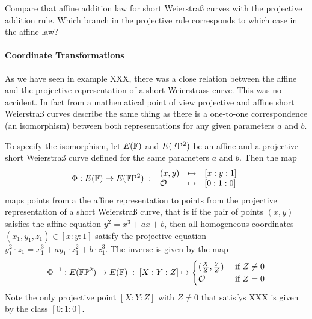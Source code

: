 


\begin{exercise}
Compare that affine addition law for short Weierstraß curves with the projective addition rule. Which branch in the projective rule corresponds to which case in the affine law?
\end{exercise}

\paragraph{Coordinate Transformations} As we have seen in example XXX, there was a close relation between the affine and the projective representation of a short Weierstrass curve. This was no accident.
In fact from a mathematical point of view projective and affine short Weierstraß curves describe the same thing as there is a one-to-one correspondence (an isomorphism) between both representations for any given parameters $a$ and $b$.

To specify the isomorphism, let $E(\mathbb{F})$ and $E(\mathbb{F}\mathrm{P}^2)$ be an affine and a projective short Weierstraß curve defined for the same parameters $a$ and $b$. Then the map
\begin{equation}
\Phi : E(\mathbb{F}) \to E(\mathbb{F}\mathrm{P}^2)\;:\;
\begin{array}{lcl}
(x,y)       &\mapsto & [x:y:1]\\
\mathcal{O} &\mapsto & [0:1:0]
\end{array}
\end{equation}
maps points from a the affine representation to points from the projective representation of a short Weierstraß curve, that is if the pair of points $(x,y)$ saisfies the affine equation $y^2= x^3 + ax + b$, then all homogeneous coordinates $(x_1,y_1,z_1)\in [x:y:1]$ satisfy the projective equation $y_1^2\cdot z_1= x_1^3 + ay_1\cdot z_1^2 + b\cdot z_1^3$. The inverse is given by the map
\begin{equation}
\Phi^{-1} : E(\mathbb{F}\mathbb{P}^2)\to E(\mathbb{F}) \;:\; [X:Y:Z] \mapsto \begin{cases}
(\frac{X}{Z},\frac{Y}{Z}) & \text{ if } Z\neq 0\\
\mathcal{O} & \text{ if } Z=0
\end{cases}
\end{equation}
Note the only projective point $[X:Y:Z]$ with $Z\neq 0$ that satisfys XXX is given by the class $[0:1:0]$.

